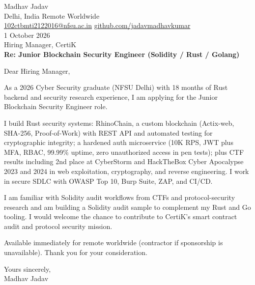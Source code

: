 \documentclass[10pt,letterpaper]{article}
\begin{document}
\begin{flushleft}
Madhav Jadav\\
Delhi, India \textbar{} Remote Worldwide\\
\href{mailto:102ctbmti2122016@nfsu.ac.in}{102ctbmti2122016@nfsu.ac.in} \textbar{} \href{https://github.com/jadavmadhavkumar}{github.com/jadavmadhavkumar}\\[8pt]
1 October 2026\\[4pt]
Hiring Manager, CertiK\\[8pt]
\textbf{Re: Junior Blockchain Security Engineer (Solidity / Rust / Golang)}\\[8pt]
\end{flushleft}
Dear Hiring Manager,

As a 2026 Cyber Security graduate (NFSU Delhi) with 18 months of Rust backend and security research experience, I am applying for the Junior Blockchain Security Engineer role.

I build Rust security systems: RhinoChain, a custom blockchain (Actix-web, SHA-256, Proof-of-Work) with REST API and automated testing for cryptographic integrity; a hardened auth microservice (10K RPS, JWT plus MFA, RBAC, 99.99\% uptime, zero unauthorized access in pen tests); plus CTF results including 2nd place at CyberStorm and HackTheBox Cyber Apocalypse 2023 and 2024 in web exploitation, cryptography, and reverse engineering. I work in secure SDLC with OWASP Top 10, Burp Suite, ZAP, and CI/CD.

I am familiar with Solidity audit workflows from CTFs and protocol-security research and am building a Solidity audit sample to complement my Rust and Go tooling. I would welcome the chance to contribute to CertiK's smart contract audit and protocol security mission.

Available immediately for remote worldwide (contractor if sponsorship is unavailable). Thank you for your consideration.

Yours sincerely,\\[8pt]
Madhav Jadav
\end{document}
